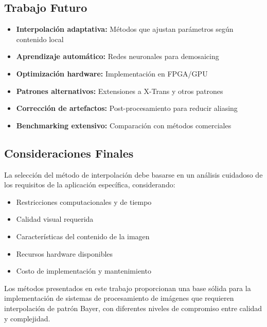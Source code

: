 \subsection{Trabajo Futuro}

\begin{itemize}
    \item \textbf{Interpolación adaptativa:} Métodos que ajustan parámetros según contenido local
    \item \textbf{Aprendizaje automático:} Redes neuronales para demosaicing
    \item \textbf{Optimización hardware:} Implementación en FPGA/GPU
    \item \textbf{Patrones alternativos:} Extensiones a X-Trans y otros patrones
    \item \textbf{Corrección de artefactos:} Post-procesamiento para reducir aliasing
    \item \textbf{Benchmarking extensivo:} Comparación con métodos comerciales
\end{itemize}

\subsection{Consideraciones Finales}

La selección del método de interpolación debe basarse en un análisis cuidadoso de los requisitos 
de la aplicación específica, considerando:

\begin{itemize}
    \item Restricciones computacionales y de tiempo
    \item Calidad visual requerida
    \item Características del contenido de la imagen
    \item Recursos hardware disponibles
    \item Costo de implementación y mantenimiento
\end{itemize}

Los métodos presentados en este trabajo proporcionan una base sólida para la implementación 
de sistemas de procesamiento de imágenes que requieren interpolación de patrón Bayer, con 
diferentes niveles de compromiso entre calidad y complejidad.